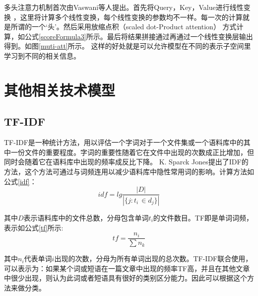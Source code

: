 多头注意力机制首次由Vaswani等人提出。首先将Query，Key，Value进行线性变换
，这里将计算多个线性变换，每个线性变换的参数均不一样。每一次的计算就是所谓的一个‘头’。然后采用放缩点积（scaled dot-Product attention）
方式计算，如公式\ref{scoreFormula3}所示。最后将结果拼接通过再通过一个线性变换层输出得到。如图\ref{muti-att}所示。
这样的好处就是可以允许模型在不同的表示子空间里学习到不同的相关信息。
\section{其他相关技术模型}
\subsection{TF-IDF}
TF-IDF是一种统计方法，用以评估一个字词对于一个文件集或一个语料库中的其中一份文件的重要程度。字词的重要性随着它在文件中出现的次数成正比增加，但同时会随着它在语料库中出现的频率成反比下降。
K. Sparck Jones提出了IDF的方法，这个方法可通过与词频连用以减少语料库中隐性常用词的影响。计算方法如公式\ref{idf}：
\begin{equation}\label{idf}
	idf=lg\frac{\left|D\right|}{\left|\{j:t_{i\ }\in d_j\}\right|}
\end{equation}

其中$D$表示语料库中的文件总数，分母包含单词$t_i$的文件数目。TF即是单词词频，表示如公式\ref{tf}所示:
\begin{equation}\label{tf}
	tf=\frac{n_i}{\sum n_k}
\end{equation}

其中$n_i$代表单词$i$出现的次数，分母为所有单词出现的总次数。TF-IDF联合使用，可以表示为：如果某个词或短语在一篇文章中出现的频率TF高，并且在其他文章中很少出现，则认为此词或者短语具有很好的类别区分能力。因此可以根据这个方法来做分类。

